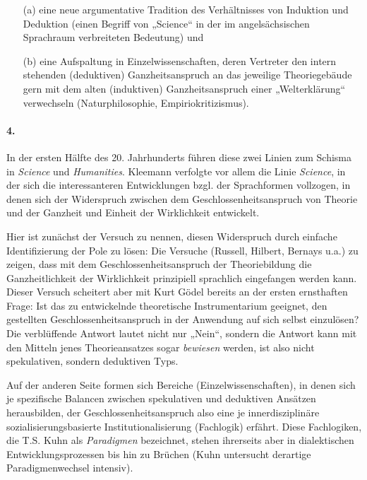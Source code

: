 \documentclass[11pt,a4paper]{article}
\begin{document}
\begin{enumerate}
\item[(a)] eine neue argumentative Tradition des Verhältnisses von Induktion
  und Deduktion (einen Begriff von „Science“ in der im angelsächsischen
  Sprachraum verbreiteten Bedeutung) und
\item[(b)] eine Aufspaltung in Einzelwissenschaften, deren Vertreter den
  intern stehenden (deduktiven) Ganzheitsanspruch an das jeweilige
  Theoriegebäude gern mit dem alten (induktiven) Ganzheitsanspruch einer
  „Welterklärung“ verwechseln (Naturphilosophie, Empiriokritizismus).
\end{enumerate}

\paragraph{4.}
In der ersten Hälfte des 20. Jahrhunderts führen diese zwei Linien zum Schisma
in \emph{Science} und \emph{Humanities}. Kleemann verfolgte vor allem die
Linie \emph{Science}, in der sich die interessanteren Entwicklungen bzgl. der
Sprachformen vollzogen, in denen sich der Widerspruch zwischen dem
Geschlossenheitsanspruch von Theorie und der Ganzheit und Einheit der
Wirklichkeit entwickelt.

Hier ist zunächst der Versuch zu nennen, diesen Widerspruch durch einfache
Identifizierung der Pole zu lösen: Die Versuche (Russell, Hilbert, Bernays
u.a.) zu zeigen, dass mit dem Geschlossenheitsanspruch der Theoriebildung die
Ganzheitlichkeit der Wirklichkeit prinzipiell sprachlich eingefangen werden
kann. Dieser Versuch scheitert aber mit Kurt Gödel bereits an der ersten
ernsthaften Frage: Ist das zu entwickelnde theoretische Instrumentarium
geeignet, den gestellten Geschlossenheitsanspruch in der Anwendung auf sich
selbst einzulösen?  Die verblüffende Antwort lautet nicht nur „Nein“, sondern
die Antwort kann mit den Mitteln jenes Theorieansatzes sogar \emph{bewiesen}
werden, ist also nicht spekulativen, sondern deduktiven Typs.

Auf der anderen Seite formen sich Bereiche (Einzelwissenschaften), in denen
sich je spezifische Balancen zwischen spekulativen und deduktiven Ansätzen
herausbilden, der Geschlossenheitsanspruch also eine je innerdisziplinäre
sozialisierungsbasierte Institutionalisierung (Fachlogik) erfährt. Diese
Fachlogiken, die T.S. Kuhn als \emph{Paradigmen} bezeichnet, stehen ihrerseits
aber in dialektischen Entwicklungsprozessen bis hin zu Brüchen (Kuhn
untersucht derartige Paradigmenwechsel intensiv).
\end{document}
